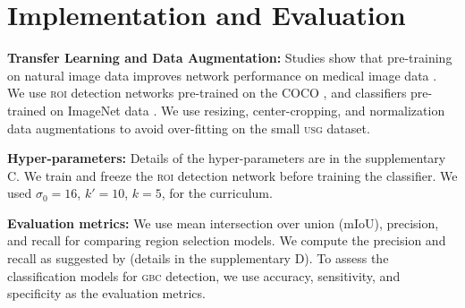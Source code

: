 \documentclass[10pt,twocolumn,letterpaper]{article}
\def\usg{\textsc{usg}\xspace}
\def\gbc{\textsc{gbc}\xspace}
\def\gb{\textsc{gb}\xspace}
\def\roi{\textsc{roi}\xspace}
\newcommand{\myfirstpara}[1]{\noindent \textbf{#1:}}
\newcommand{\mypara}[1]{\vspace{0.1em} \myfirstpara{#1}}
\begin{document}
\begin{table}[t]
{	}
	\caption{The model performances on the test set and the 10-fold cross validation (Mean$\pm$SD) in classifying \gbc from USG images. Apart from the standard accuracy of classifying normal, benign, and malignant \gb, we show the binary classification (malignancy vs. non-malignancy) accuracy on the test set (column Acc.-2). We also report the \gbc detection performance of two expert radiologists on the test set. The radiologists classified each test image without accessing the biopsy results or any other patient data. Note that our model significantly outperforms even the human radiologists. Recall that our ground truth labels are biopsy-proven. The performance of human radiologists in the our study is comparable to that reported in literature \cite{bo2019diagnostic, gupta2020evaluation}. }
	\label{tbl:perf_gbc}
\end{table} 
\section{Implementation and Evaluation}

\myfirstpara{Transfer Learning and Data Augmentation}
Studies show that pre-training on natural image data improves network performance on medical image data \cite{alzubaidi2020transferlearning, cheng2017transfer}. We use \roi detection networks pre-trained on the COCO \cite{coco}, and classifiers pre-trained on ImageNet data \cite{imagenet}. We use resizing, center-cropping, and normalization data augmentations to avoid over-fitting on the small \usg dataset.

\mypara{Hyper-parameters}
Details of the hyper-parameters are in the supplementary C. We train and freeze the \roi detection network before training the classifier. We used $\sigma_0\!=\!16$, $k'\!=\!10$, $k\!=\!5$, for the curriculum.

\mypara{Evaluation metrics}
We use mean intersection over union (mIoU), precision, and recall for comparing region selection models. We compute the precision and recall as suggested by \cite{ribli2018detecting} (details in the supplementary D). To assess the classification models for \gbc detection, we use accuracy, sensitivity, and specificity as the evaluation metrics. 
\end{document}
